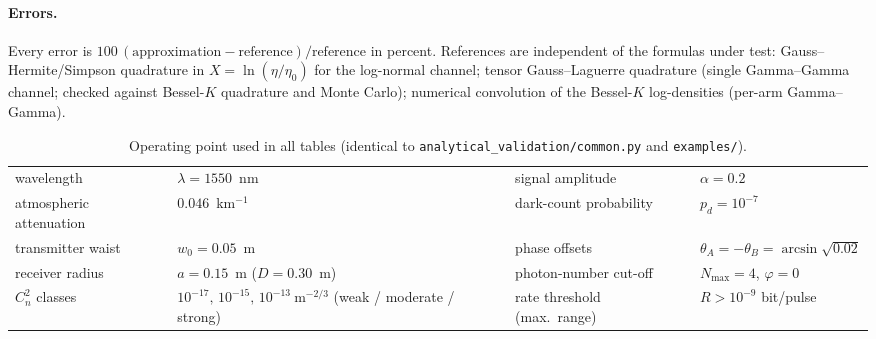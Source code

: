 \documentclass[11pt,a4paper]{article}
\theoremstyle{plain}
\theoremstyle{remark}
\begin{document}
\paragraph{Errors.} Every error is $100\,(\text{approximation}-\text{reference})/\text{reference}$ in percent. References are independent of the formulas under test: Gauss--Hermite/Simpson quadrature in $X=\ln(\eta/\eta_0)$ for the log-normal channel; tensor Gauss--Laguerre quadrature (single Gamma--Gamma channel; checked against Bessel-$K$ quadrature and Monte Carlo); numerical convolution of the Bessel-$K$ log-densities (per-arm Gamma--Gamma).

\begin{table}[htbp]
\centering\small
\caption{Operating point used in all tables (identical to \texttt{analytical\_validation/common.py} and \texttt{examples/}).}
\label{tab:params}
\begin{tabular}{ll@{\qquad}ll}
\toprule
wavelength & $\lambda=1550$~nm & signal amplitude & $\alpha=0.2$ \\
atmospheric attenuation & $0.046$~km$^{-1}$ & dark-count probability & $p_d=10^{-7}$ \\
transmitter waist & $w_0=0.05$~m & phase offsets & $\theta_A=-\theta_B=\arcsin\sqrt{0.02}$ \\
receiver radius & $a=0.15$~m ($D=0.30$~m) & photon-number cut-off & $N_{\max}=4$,\; $\varphi=0$ \\
$C_n^2$ classes & $10^{-17},\,10^{-15},\,10^{-13}\ \mathrm{m^{-2/3}}$ (weak / moderate / strong) & rate threshold (max.\ range) & $R>10^{-9}$ bit/pulse \\
\bottomrule
\end{tabular}
\end{table}
\end{document}
